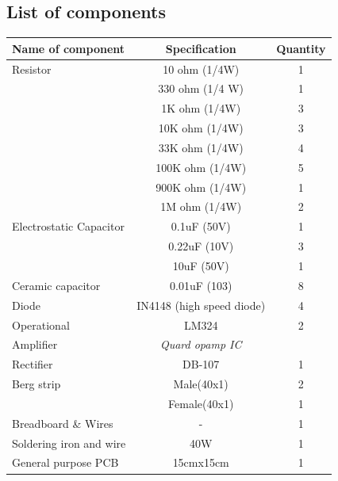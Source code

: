 \documentclass[a4paper,12pt,oneside]{book}
\begin{document}
\begin{appendices}
\subsection*{List of components}
\begin{tabular}{|l|c|c|}
	\hline
	\textbf{Name of component} & \textbf{Specification}& \textbf{Quantity}\\ \hline
	Resistor& 10 ohm (1/4W)&1\\ \hline
	&330 ohm (1/4 W)&1 \\ \cline{2-3}
	&1K ohm (1/4W)&3 \\ \cline{2-3}
	&10K ohm (1/4W)&3 \\ \cline{2-3}
	&33K ohm (1/4W)&4 \\ \cline{2-3}
	&100K ohm (1/4W)&5 \\ \cline{2-3}
	&900K ohm (1/4W)&1 \\ \cline{2-3}
	&1M ohm (1/4W)&2 \\ \hline
	Electrostatic Capacitor& 0.1uF (50V)&1\\ \cline{2-3}
	&0.22uF (10V)&3 \\ \cline{2-3}
	&10uF (50V)&1 \\ \hline
	Ceramic capacitor& 0.01uF (103)&8 \\\hline
	Diode&IN4148 (high speed diode)&4 \\\hline
	Operational& LM324&2\\
	Amplifier&\textit{Quard opamp IC}&\\\hline
	Rectifier&DB-107&1 \\\hline
	Berg strip&Male(40x1)&2 \\\cline{2-3}
	&Female(40x1)&1\\\hline
	Breadboard \& Wires & -&1 \\\hline
	Soldering iron and wire& 40W&1 \\\hline
	General purpose PCB & 15cmx15cm&1 \\\hline	
\end{tabular}
\\\\\\\\

\end{appendices}
\end{document}
